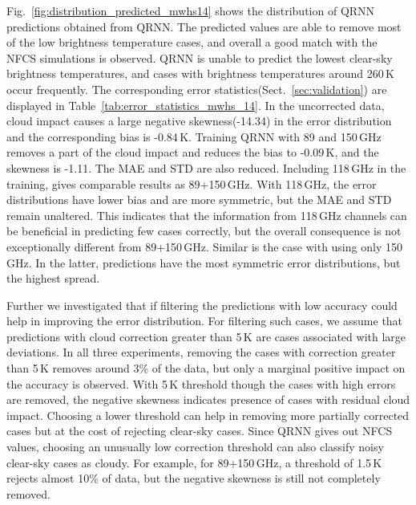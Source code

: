 \documentclass[amt, manuscript]{copernicus}
\begin{document}
Fig.~\ref{fig:distribution_predicted_mwhs14} shows the distribution of QRNN predictions obtained from QRNN. The predicted values are able to remove most of the low brightness temperature cases, and overall a good match with the NFCS simulations is observed. QRNN is unable to predict the lowest clear-sky brightness temperatures, and cases with brightness temperatures around 260\,K occur frequently. The corresponding error statistics(Sect.~\ref{sec:validation}) are displayed in  Table~\ref{tab:error_statistics_mwhs_14}. In the uncorrected data, cloud impact causes a large negative skewness(-14.34) in the error distribution and the corresponding bias is -0.84\,K. Training QRNN with 89 and 150\,GHz removes a part of the cloud impact and reduces the bias to -0.09\,K, and the skewness is -1.11. The MAE and STD are also reduced. Including 118\,GHz in the training, gives comparable results as 89+150\,GHz. With 118\,GHz, the error distributions have lower bias and are more symmetric, but the MAE and STD remain unaltered. This indicates that the information from 118\,GHz channels can be beneficial in predicting few cases correctly, but the overall consequence is not exceptionally different from 89+150\,GHz. Similar is the case with using only 150\,GHz. In the latter, predictions have the most symmetric  error distributions, but the highest spread. 

Further we investigated that if filtering the predictions with low accuracy could help in improving the error distribution. For filtering such cases, we assume that predictions with cloud correction greater than 5\,K are cases associated with large deviations. In all three experiments, removing the cases with correction greater than 5\,K removes around 3\% of the data, but only a marginal positive impact on the accuracy is observed. With 5\,K threshold though the cases with high errors are removed, the negative skewness indicates presence of cases with residual cloud impact. Choosing a lower threshold can help in removing more partially corrected cases but at the cost of rejecting clear-sky cases. Since QRNN gives out NFCS values, choosing an unusually low correction threshold can also classify noisy clear-sky cases as cloudy. For example, for 89+150\,GHz, a threshold of 1.5\,K rejects almost 10\% of data, but the negative skewness is still not completely removed. 
\end{document}

